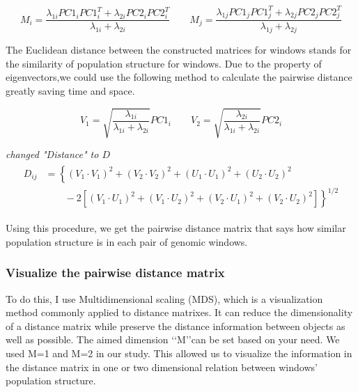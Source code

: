 \documentclass[11pt, oneside]{article}   	%
\newcommand{\plr}[1]{{\em \color{blue} #1}}
\begin{document}
{\begin{equation}
M_{i}=\frac{\lambda _{1i}PC1_{i}PC1_{i}^{T}+\lambda _{2i}PC2_{i}PC2_{i}^{T}}{\lambda _{1i}+\lambda _{2i}} \qquad
M_{j}=\frac{\lambda _{1j}PC1_{j}PC1_{j}^{T}+\lambda _{2j}PC2_{j}PC2_{j}^{T}}{\lambda _{1j}+\lambda _{2j}}
\end{equation}

The Euclidean distance between the constructed matrices for windows stands for the
similarity of population structure for windows. Due to the property of eigenvectors,we
could use the following method to calculate the pairwise distance greatly saving time and space.

\begin{equation}
V_{1}=\sqrt{\frac{\lambda _{1i}}{\lambda _{1i}+\lambda _{2i}}}PC1_{i} \qquad
V_{2}=\sqrt{\frac{\lambda _{2i}}{\lambda _{1i}+\lambda _{2i}}}PC2_{i}
\end{equation}

\plr{changed "Distance" to $D$}
\begin{align}
    \begin{split}
    D_{ij} &= 
        \left \{
                \left ( 
                    V_{1}\cdot V_{1}^{} 
                \right )^{2}
                + \left ( V_{2}\cdot V_{2}^{} \right )^{2}
                + \left ( U_{1}\cdot U_{1}^{} \right )^{2} 
                +\left ( U_{2}\cdot U_{2}^{} \right )^{2} 
        \right. \\ 
        & \left. \qquad {}  
            -2\left [ 
                \left ( V_{1}\cdot U_{1}^{} \right )^{2}
                + \left ( V_{1}\cdot U_{2}^{} \right )^{2}
                + \left ( V_{2}\cdot U_{1}^{} \right )^{2} 
                + \left ( V_{2}\cdot U_{2}^{} \right )^{2}
            \right ]
        \right \}^{1/2}
    \end{split}
\end{align}

Using this procedure, 
we get the pairwise distance matrix that says how similar population structure is 
in each pair of genomic windows.
\subsubsection{Visualize the pairwise distance matrix}
To do this, I use Multidimensional scaling (MDS), 
which is a visualization method commonly applied to distance matrixes. 
It can reduce the dimensionality of a distance matrix while preserve the distance information between objects as well as possible. The aimed dimension \lq\lq M\rq\rq can be set based on your need. We used M=1 and M=2 in our study. This allowed us to visualize the information in the distance matrix in one or two dimensional relation between windows' population structure.

}
\end{document}
